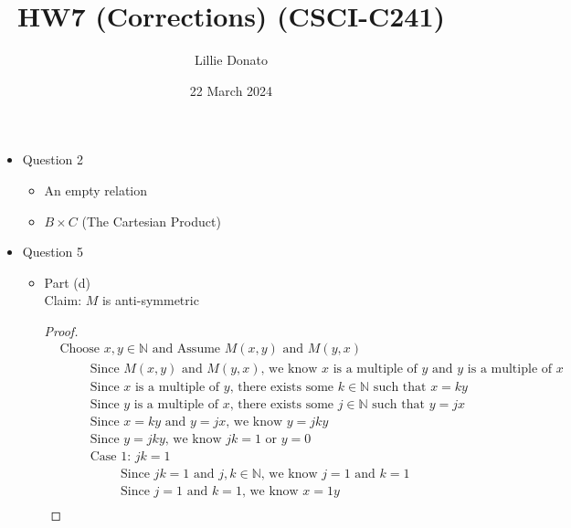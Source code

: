 \documentclass{article}
\title{HW7 (Corrections) (CSCI-C241)}
\author{Lillie Donato}
\date{22 March 2024}
\begin{document}
\maketitle

\begin{itemize}
    \item Question 2
    \begin{itemize}
        \item An empty relation
        \item $B \times C$ (The Cartesian Product)
    \end{itemize}
    \item Question 5
    \begin{itemize}
        \item Part (d) \\
        Claim: $M$ is anti-symmetric
        \begin{proof}
            \begin{align}
                &\text{Choose } x,y \in \mathbb{N} \text{ and Assume } M(x,y) \text{ and } M(y,x) \\
                &\hspace{1cm} \text{Since } M(x,y) \text{ and } M(y,x) \text{, we know } x \text{ is a multiple of } y \text{ and } y \text{ is a multiple of } x \\
                &\hspace{1cm} \text{Since } x \text{ is a multiple of } y \text{, there exists some } k \in \mathbb{N} \text{ such that } x = ky \\
                &\hspace{1cm} \text{Since } y \text{ is a multiple of } x \text{, there exists some } j \in \mathbb{N} \text{ such that } y = jx \\
                &\hspace{1cm} \text{Since } x = ky \text{ and } y = jx \text{, we know } y = jky \\
                &\hspace{1cm} \text{Since } y=jky \text{, we know } jk=1 \text{ or } y=0 \\
                &\hspace{1cm} \text{Case 1: } jk=1 \\
                &\hspace{2cm} \text{Since } jk = 1 \text{ and } j,k \in \mathbb{N} \text{, we know } j = 1 \text{ and } k = 1 \\
                &\hspace{2cm} \text{Since } j = 1 \text{ and } k = 1 \text{, we know } x = 1y \\

\end{align}
\end{proof}
\end{itemize}
\end{itemize}
\end{document}
